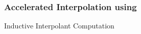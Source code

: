\begin{frame}[t]
	\frametitle{Accelerated Interpolation using \qvasr}
	\begin{center}
		Inductive Interpolant Computation
	\end{center}
	\begin{columns}
		\begin{column}{0.45\textwidth}
			\resizebox{0.75\textwidth}{!}{}
		\end{column}
		\begin{column}{0.45\textwidth}
			\begin{center}
				\resizebox{0.75\textwidth}{!}{}
			\end{center}
		\end{column}
	\end{columns}
\end{frame}